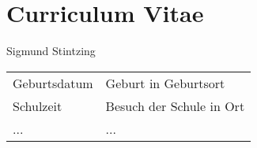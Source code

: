 \chapter*{Curriculum Vitae}

Sigmund Stintzing

\vspace*{2.0cm}

\begin{tabular}{ll}

Geburtsdatum & Geburt in Geburtsort \\[1.5ex]
Schulzeit & Besuch der Schule in Ort \\[1.5ex]
 ... & ...
\end{tabular}

